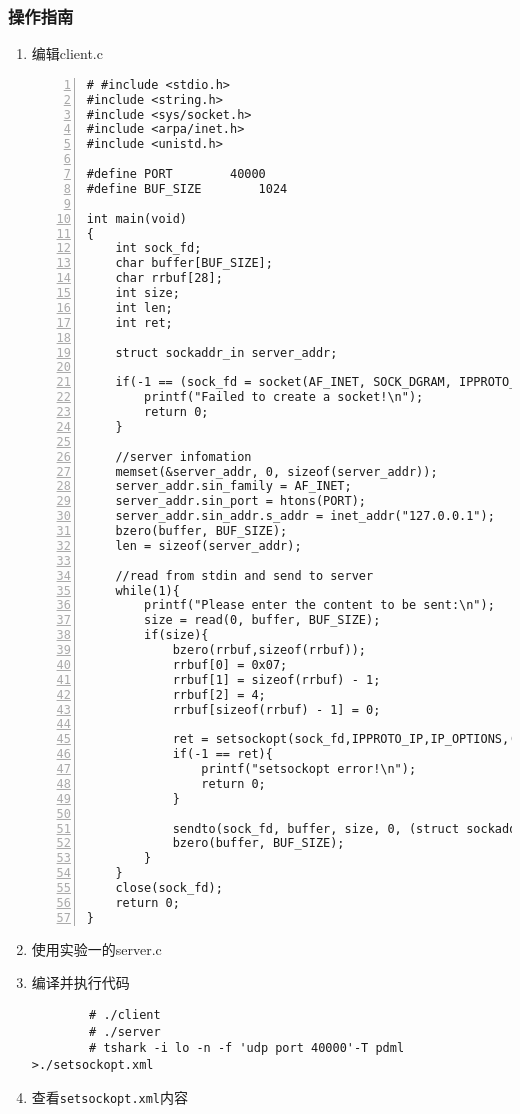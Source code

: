 \documentclass{article}
\begin{document}
\subsubsection{操作指南}
\begin{enumerate}

	\item 编辑client.c
	      \begin{lstlisting}[numbers=left]
# #include <stdio.h>
#include <string.h>
#include <sys/socket.h>
#include <arpa/inet.h>
#include <unistd.h>

#define PORT		40000
#define BUF_SIZE        1024

int main(void)
{
	int sock_fd;
	char buffer[BUF_SIZE];
	char rrbuf[28];
	int size;
	int len;
	int ret;

	struct sockaddr_in server_addr;

	if(-1 == (sock_fd = socket(AF_INET, SOCK_DGRAM, IPPROTO_IP)) ){
		printf("Failed to create a socket!\n");
		return 0;
	}

	//server infomation
	memset(&server_addr, 0, sizeof(server_addr));
	server_addr.sin_family = AF_INET;
	server_addr.sin_port = htons(PORT);
	server_addr.sin_addr.s_addr = inet_addr("127.0.0.1");
	bzero(buffer, BUF_SIZE);
	len = sizeof(server_addr);

	//read from stdin and send to server
	while(1){
		printf("Please enter the content to be sent:\n");
		size = read(0, buffer, BUF_SIZE);
		if(size){
			bzero(rrbuf,sizeof(rrbuf));
			rrbuf[0] = 0x07;
			rrbuf[1] = sizeof(rrbuf) - 1;
			rrbuf[2] = 4;
			rrbuf[sizeof(rrbuf) - 1] = 0;
			
			ret = setsockopt(sock_fd,IPPROTO_IP,IP_OPTIONS,(void*)rrbuf,sizeof(rrbuf));
			if(-1 == ret){
				printf("setsockopt error!\n");
				return 0;
			}

			sendto(sock_fd, buffer, size, 0, (struct sockaddr*)&server_addr, len);
			bzero(buffer, BUF_SIZE);
		}
	}
	close(sock_fd);
	return 0;
}

\end{lstlisting}
	\item 使用实验一的server.c
	\item 编译并执行代码
	      \begin{lstlisting}
        # ./client
        # ./server
        # tshark -i lo -n -f 'udp port 40000'-T pdml >./setsockopt.xml
    \end{lstlisting}
	\item 查看\verb|setsockopt.xml|内容
\end{enumerate}
\end{document}
